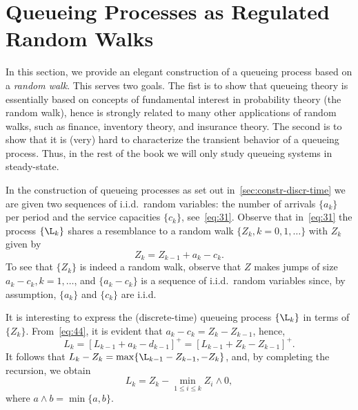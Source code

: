 

\section{Queueing Processes as Regulated Random Walks}
\label{sec:queu-proc-as}


In this section, we provide an elegant construction of a queueing process based on a \emph{random walk}.
This serves two goals.
The fist is to show that queueing theory is essentially based on concepts of fundamental interest in probability theory (the random walk), hence is strongly related to many other applications of random walks, such as finance, inventory theory, and insurance theory.
The second is to show that it is (very) hard to characterize the transient behavior of a queueing process.
Thus, in the rest of the book we will only study queueing systems in steady-state.







In the construction of queueing processes as set out in~\cref{sec:constr-discr-time} we are given two sequences of i.i.d.\ random variables: the number of arrivals $\{a_k\}$ per period and the service capacities $\{c_k\}$, see~\cref{eq:31}.
Observe that in~\cref{eq:31} the process $\{\L_k\}$ shares a resemblance to a random walk $\{Z_k, k=0,1,\ldots\}$ with $Z_k$ given by
\begin{equation}\label{eq:44}
 Z_k = Z_{k-1} + a_k - c_k.
\end{equation}
To see that $\{Z_k\}$ is indeed a random walk, observe that $Z$ makes jumps of size $a_k-c_k, k=1,\ldots$, and $\{a_k-c_k\}$ is a sequence of i.i.d.\ random variables since, by assumption, $\{a_k\}$ and $\{c_k\}$ are i.i.d.


It is interesting to express the (discrete-time) queueing process $\{\L_k\}$ in terms of $\{Z_k\}$. From~\cref{eq:44}, it is evident that $a_k - c_k = Z_k - Z_{k-1}$, hence,
\begin{equation*}
 L_k = [L_{k-1} +a_k- d_{k-1}]^+ = [L_{k-1} +Z_k- Z_{k-1}]^+.
\end{equation*}
It follows that  $L_k - Z_{k} = \max\{\L_{k-1} - Z_{k-1}, -Z_k\}$,
and, by completing the recursion, we obtain
\begin{equation}\label{eq:reich1}
 L_k = Z_k - \min_{1\leq i \leq k} Z_i\wedge 0,
\end{equation}
where $a\wedge b = \min\{a,b\}$.



